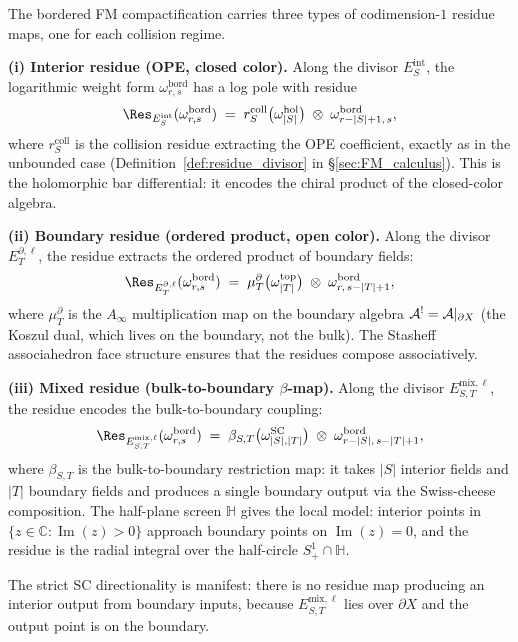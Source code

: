 \begin{construction}
\label{constr:three-residues}
The bordered FM compactification carries three types of
codimension-$1$ residue maps, one for each collision regime.

\medskip
\noindent\textbf{(i) Interior residue (OPE, closed color).}
Along the divisor $E_S^{\mathrm{int}}$, the logarithmic weight
form $\omega^{\mathrm{bord}}_{r,s}$ has a log pole with
residue
\[
\Res_{E_S^{\mathrm{int}}}(\omega^{\mathrm{bord}}_{r,s})
\;=\;
r^{\mathrm{coll}}_S\bigl(\omega^{\mathrm{hol}}_{|S|}\bigr)
\;\otimes\;
\omega^{\mathrm{bord}}_{r-|S|+1,\,s},
\]
where $r^{\mathrm{coll}}_S$ is the collision residue extracting the
OPE coefficient, exactly as in the unbounded case
(Definition~\ref{def:residue_divisor} in \S\ref{sec:FM_calculus}).
This is the holomorphic bar differential: it encodes the chiral
product of the closed-color algebra.

\medskip
\noindent\textbf{(ii) Boundary residue (ordered product, open
color).}
Along the divisor $E_T^{\partial,\ell}$, the residue extracts
the ordered product of boundary fields:
\[
\Res_{E_T^{\partial,\ell}}(\omega^{\mathrm{bord}}_{r,s})
\;=\;
\mu_T^{\partial}\bigl(\omega^{\mathrm{top}}_{|T|}\bigr)
\;\otimes\;
\omega^{\mathrm{bord}}_{r,\,s-|T|+1},
\]
where $\mu_T^{\partial}$ is the $A_\infty$ multiplication map
on the boundary algebra $\mathcal{A}^! = \mathcal{A}|_{\partial X}$
(the Koszul dual, which lives on the boundary,
not the bulk). The Stasheff associahedron face structure
ensures that the residues compose associatively.

\medskip
\noindent\textbf{(iii) Mixed residue (bulk-to-boundary
$\beta$-map).}
Along the divisor $E_{S,T}^{\mathrm{mix},\ell}$, the residue
encodes the bulk-to-boundary coupling:
\[
\Res_{E_{S,T}^{\mathrm{mix},\ell}}
(\omega^{\mathrm{bord}}_{r,s})
\;=\;
\beta_{S,T}\bigl(\omega^{\mathrm{SC}}_{|S|,|T|}\bigr)
\;\otimes\;
\omega^{\mathrm{bord}}_{r-|S|,\,s-|T|+1},
\]
where $\beta_{S,T}$ is the bulk-to-boundary restriction map:
it takes $|S|$ interior fields and $|T|$ boundary fields and
produces a single boundary output via the Swiss-cheese composition.
The half-plane screen $\mathbb H$ gives the local model: interior
points in $\{z\in\mathbb C:\operatorname{Im}(z)>0\}$ approach
boundary points on $\operatorname{Im}(z)=0$, and the residue
is the radial integral over the half-circle
$S^1_+\cap\mathbb H$.

\medskip
The strict SC directionality is manifest: there is no residue map
producing an interior output from boundary inputs, because
$E_{S,T}^{\mathrm{mix},\ell}$ lies over $\partial X$ and the
output point is on the boundary.
\end{construction}

